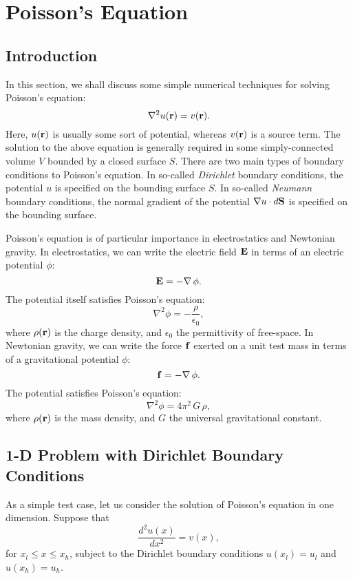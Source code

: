 \chapter{Poisson's Equation}
\section{Introduction}
In this section, we shall discuss some simple numerical techniques for
solving Poisson's equation:
\begin{equation}
\nabla^2 u({\bf r}) = v({\bf r}).
\end{equation}
Here, $u({\bf r})$ is usually some sort of potential, whereas $v({\bf r})$ is a
source term.
The solution to the above equation is generally required in some simply-connected volume $V$ bounded by a
closed surface $S$. There are two main types of boundary conditions to Poisson's equation.
In so-called {\em Dirichlet} boundary conditions, the potential $u$ is specified on the bounding
surface $S$. In so-called {\em Neumann} boundary conditions, the normal gradient of the
potential $\nabla u\cdot d{\bf S}$ is specified on the bounding surface.

Poisson's equation is of particular importance in electrostatics and Newtonian gravity.
In electrostatics, we can write the electric field ${\bf E}$ in terms of an electric
potential $\phi$:
\begin{equation}
{\bf E} = - \nabla\,\phi.
\end{equation}
The potential itself satisfies Poisson's equation:
\begin{equation}\label{estat}
\nabla^2 \phi = - \frac{\rho}{\epsilon_0},
\end{equation}
where $\rho({\bf r})$ is the charge density, and $\epsilon_0$ the permittivity of
free-space. In Newtonian gravity, we can write the force ${\bf f}$ exerted on a
unit test mass in terms of a gravitational potential $\phi$:
\begin{equation}
{\bf f} = - \nabla\,\phi.
\end{equation}
The potential satisfies Poisson's equation:
\begin{equation}
\nabla^2 \phi = 4\pi^2\,G\,\rho,
\end{equation}
where  $\rho({\bf r})$ is the mass density, and $G$ the universal gravitational
constant.

\section{1-D Problem with Dirichlet Boundary Conditions}\label{pois1d}
As a simple test case, let us consider the solution of Poisson's equation
in one dimension. Suppose that
\begin{equation}
\frac{d^2 u(x)}{dx^2} = v(x),
\end{equation}
for $x_l\leq x\leq x_h$, subject to the Dirichlet boundary conditions
$u(x_l) = u_l$ and $u(x_h) = u_h$. 

